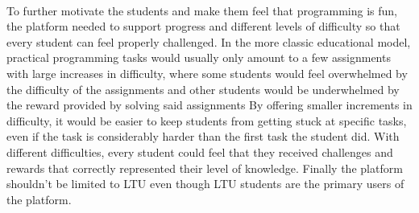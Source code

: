 \\
To further motivate the students and make them feel that programming is fun, the platform needed to support progress and different levels of difficulty so that every student can feel properly challenged. In the more classic educational model, practical programming tasks would usually only amount to a few assignments with large increases in difficulty, where some students would feel overwhelmed by the difficulty of the assignments and other students would be underwhelmed by the reward provided by solving said assignments
By offering smaller increments in difficulty, it would be easier to keep students from getting stuck at specific tasks, even if the task is considerably harder than the first task the student did. With different difficulties, every student could feel that they received challenges and rewards that correctly represented their level of knowledge.
Finally the platform shouldn't be limited to LTU even though LTU students are the primary users of the platform.